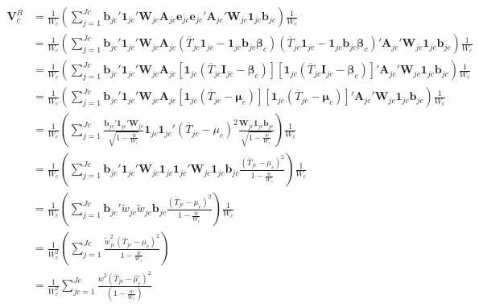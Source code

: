 \begin{equation}
\begin{split}
    \mathbf{V}^R_c &= \frac{1}{W_c} \left(\sum_{j=1}^{Jc} \mathbf{b}_{jc}' \mathbf{1}_{jc}'\mathbf{W}_{jc} \mathbf{A}_{jc} \mathbf{e}_{jc} \mathbf{e}_{jc}' \mathbf{A}_{jc}'  \mathbf{W}_{jc}\mathbf{1}_{jc}\mathbf{b}_{jc}   \right) \frac{1}{W_c} \\
    &= \frac{1}{W_c} \left(\sum_{j=1}^{Jc} \mathbf{b}_{jc}' \mathbf{1}_{jc}'\mathbf{W}_{jc} \mathbf{A}_{jc} \left(\overline{T}_{jc} \mathbf{1}_{jc} - \mathbf{1}_{jc}\mathbf{b}_{jc}\mathbf{\beta}_{c} \right) \left(\overline{T}_{jc} \mathbf{1}_{jc} - \mathbf{1}_{jc}\mathbf{b}_{jc}\mathbf{\beta}_{c} \right)' \mathbf{A}_{jc}'  \mathbf{W}_{jc}\mathbf{1}_{jc}\mathbf{b}_{jc}   \right) \frac{1}{W_c} \\
    &= \frac{1}{W_c} \left(\sum_{j=1}^{Jc} \mathbf{b}_{jc}' \mathbf{1}_{jc}'\mathbf{W}_{jc} \mathbf{A}_{jc} \left[\mathbf{1}_{jc}\left(\overline{T}_{jc} \mathbf{I}_{jc}  - \mathbf{\beta}_{c} \right) \right] \left[\mathbf{1}_{jc}\left(\overline{T}_{jc} \mathbf{I}_{jc} - \mathbf{\beta}_{c} \right) \right]' \mathbf{A}_{jc}'  \mathbf{W}_{jc}\mathbf{1}_{jc}\mathbf{b}_{jc}   \right) \frac{1}{W_c} \\
    &= \frac{1}{W_c} \left(\sum_{j=1}^{Jc} \mathbf{b}_{jc}' \mathbf{1}_{jc}'\mathbf{W}_{jc} \mathbf{A}_{jc} \left[\mathbf{1}_{jc}\left(\overline{T}_{jc}   - \mathbf{\mu}_{c} \right) \right] \left[\mathbf{1}_{jc}\left(\overline{T}_{jc}  - \mathbf{\mu}_{c} \right) \right]' \mathbf{A}_{jc}'  \mathbf{W}_{jc}\mathbf{1}_{jc}\mathbf{b}_{jc}   \right) \frac{1}{W_c} \\
    &= \frac{1}{W_c} \left(\sum_{j=1}^{Jc} \frac{ \mathbf{b}_{jc}' \mathbf{1}_{jc}'\mathbf{W}_{jc}}{\sqrt{1-\frac{\ddot{w}}{W_c}}}   \mathbf{1}_{jc} \mathbf{1}_{jc}' \left(\overline{T}_{jc} - \mu_c \right)^2 \frac{  \mathbf{W}_{jc} \mathbf{1}_{jc} \mathbf{b}_{jc}}{\sqrt{1-\frac{\ddot{w}}{W_c}}}  \right) \frac{1}{W_c} \\
    &= \frac{1}{W_c} \left(\sum_{j=1}^{Jc}  \mathbf{b}_{jc}' \mathbf{1}_{jc}'\mathbf{W}_{jc} \mathbf{1}_{jc} \mathbf{1}_{jc}' \mathbf{W}_{jc} \mathbf{1}_{jc} \mathbf{b}_{jc}   \frac{\left(\overline{T}_{jc} - \mu_c \right)^2}{1-\frac{\ddot{w}}{W_c}}   \right) \frac{1}{W_c} \\
    &= \frac{1}{W_c} \left(\sum_{j=1}^{Jc}  \mathbf{b}_{jc}' \tilde{w}_{jc} \tilde{w}_{jc} \mathbf{b}_{jc}   \frac{\left(\overline{T}_{jc} - \mu_c \right)^2}{1-\frac{\ddot{w}}{W_c}}   \right) \frac{1}{W_c} \\
    &= \frac{1}{W_c^2} \left(\sum_{j=1}^{Jc}   \frac{\tilde{w}_{jc}^2\left(\overline{T}_{jc} - \mu_c \right)^2}{1-\frac{\ddot{w}}{W_c}}   \right) \\
        &= \frac{1}{W_c^2}\sum_{jc=1}^{Jc} \frac{\ddot{w}^2(\overline{T}_{jc}-\hat{\mu_{c}})^2}{(1-\frac{\ddot{w}}{W_c})} \\
\end{split}
\end{equation}

